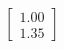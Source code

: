 \documentclass[preview]{standalone}
\begin{document}
\begin{align*}
\begin{bmatrix} 1.00 \\ 1.35 \end{bmatrix}
\end{align*}
\end{document}
